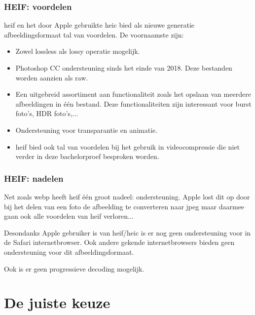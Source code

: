 \subsubsection{HEIF: voordelen}
\label{sec:afbeeldingscompressie-heif-voordelen}

\Gls{heif} en het door Apple gebruikte \gls{heic} bied als nieuwe generatie \gls{afbeeldingsformaat} tal van voordelen. De voornaamste zijn: 

\begin{itemize}
	\item Zowel \gls{lossless} als \gls{lossy} operatie mogelijk.
	
	\item Photoshop CC ondersteuning sinds het einde van 2018. Deze bestanden worden aanzien als \gls{raw}.
	
	\item Een uitgebreid assortiment aan functionaliteit zoals het opslaan van meerdere afbeeldingen in één bestand. Deze functionaliteiten zijn interessant voor burst foto's, HDR foto's,...
	
	\item Ondersteuning voor transparantie en animatie.
	
	\item \Gls{heif} bied ook tal van voordelen bij het gebruik in \gls{videocompressie} die niet verder in deze bachelorproef besproken worden.
\end{itemize}

\subsubsection{HEIF: nadelen}
\label{sec:afbeeldingscompressie-heif-nadelen}

Net zoals \gls{webp} heeft \gls{heif} één groot nadeel: ondersteuning. Apple lost dit op door bij het delen van een foto de afbeelding te converteren naar \gls{jpeg} maar daarmee gaan ook alle voordelen van \gls{heif} verloren... 

Desondanks Apple gebruiker is van \gls{heif}/\gls{heic} is er nog geen ondersteuning voor in de Safari internetbrowser. Ook andere gekende internetbrowsers bieden geen ondersteuning voor dit \gls{afbeeldingsformaat}.

Ook is er geen progressieve \gls{decoding} mogelijk.

\section{De juiste keuze}
\label{sec:afbeeldingscompressie-keuze}

